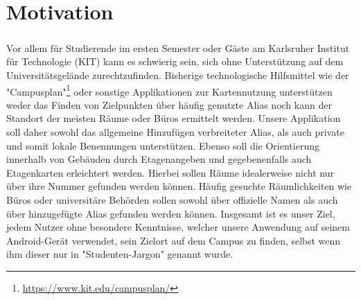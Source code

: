 \chapter{Motivation}

\paragraph{}
Vor allem für Studierende im ersten Semester oder Gäste am Karlsruher Institut für Technologie (KIT) 
kann es schwierig sein, sich ohne Unterstützung auf dem Universitätsgelände zurechtzufinden. Bisherige 
technologische Hilfsmittel wie der "Campusplan"\footnote{\href{https://www.kit.edu/campusplan/}{https://www.kit.edu/campusplan/}} oder sonstige Applikationen
zur Kartennutzung unterstützen weder das Finden von Zielpunkten über häufig genutzte \Gls{Alias} noch kann der Standort der meisten Räume oder Büros ermittelt werden.
Unsere Applikation soll daher sowohl das allgemeine Hinzufügen verbreiteter Alias, als auch private und somit lokale
Benennungen unterstützen. Ebenso soll die Orientierung innerhalb von Gebäuden durch Etagenangeben und gegebenenfalls auch
Etagenkarten erleichtert werden. Hierbei sollen Räume idealerweise nicht nur über ihre Nummer gefunden werden können.
Häufig gesuchte Räumlichkeiten wie Büros oder universitäre Behörden sollen sowohl über offizielle Namen als auch
über hinzugefügte Alias gefunden werden können.
Insgesamt ist es unser Ziel, jedem Nutzer ohne besondere Kenntnisse, welcher unsere Anwendung auf seinem 
Android-Gerät verwendet, sein Zielort auf dem Campus zu finden, selbst wenn ihm dieser nur in "Studenten-Jargon"
genannt wurde. 